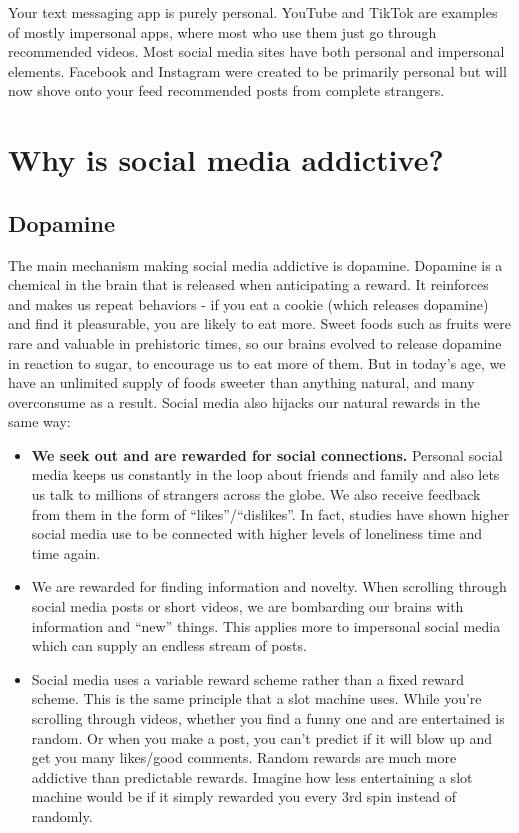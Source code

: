 \documentclass[
  openany]{book}
\providecommand{\tightlist}{%
  \setlength{\itemsep}{0pt}\setlength{\parskip}{0pt}}
\begin{document}
Your text messaging app is purely personal. YouTube and TikTok are examples of mostly impersonal apps, where most who use them just go through recommended videos. Most social media sites have both personal and impersonal elements. Facebook and Instagram were created to be primarily personal but will now shove onto your feed recommended posts from complete strangers.

\section{Why is social media addictive?}\label{why-is-social-media-addictive}

\subsection{Dopamine}\label{dopamine}

The main mechanism making social media addictive is dopamine. Dopamine is a chemical in the brain that is released when anticipating a reward. It reinforces and makes us repeat behaviors - if you eat a cookie (which releases dopamine) and find it pleasurable, you are likely to eat more. Sweet foods such as fruits were rare and valuable in prehistoric times, so our brains evolved to release dopamine in reaction to sugar, to encourage us to eat more of them. But in today's age, we have an unlimited supply of foods sweeter than anything natural, and many overconsume as a result. Social media also hijacks our natural rewards in the same way:

\begin{itemize}
\tightlist
\item
  \textbf{We seek out and are rewarded for social connections.} Personal social media keeps us constantly in the loop about friends and family and also lets us talk to millions of strangers across the globe. We also receive feedback from them in the form of ``likes''/``dislikes''. In fact, studies have shown higher social media use to be connected with higher levels of loneliness time and time again.
\item
  We are rewarded for finding information and novelty. When scrolling through social media posts or short videos, we are bombarding our brains with information and ``new'' things. This applies more to impersonal social media which can supply an endless stream of posts.
\item
  Social media uses a variable reward scheme rather than a fixed reward scheme. This is the same principle that a slot machine uses. While you're scrolling through videos, whether you find a funny one and are entertained is random. Or when you make a post, you can't predict if it will blow up and get you many likes/good comments. Random rewards are much more addictive than predictable rewards. Imagine how less entertaining a slot machine would be if it simply rewarded you every 3rd spin instead of randomly.
\end{itemize}
\end{document}
